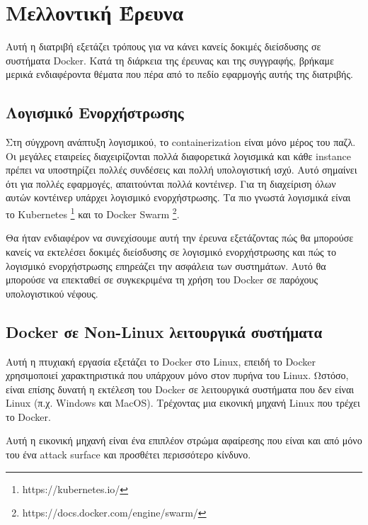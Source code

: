 \chapter{Μελλοντική Έρευνα}
\label{futureWork}

Αυτή η διατριβή εξετάζει τρόπους για να κάνει κανείς δοκιμές διείσδυσης σε
συστήματα \textlatin{Docker}. Κατά τη διάρκεια της έρευνας και της συγγραφής,
βρήκαμε μερικά ενδιαφέροντα θέματα που πέρα από το πεδίο εφαρμογής αυτής της
διατριβής.

\section{Λογισμικό Ενορχήστρωσης}

Στη σύγχρονη ανάπτυξη λογισμικού, το \textlatin{containerization} είναι μόνο
μέρος του παζλ. Οι μεγάλες εταιρείες διαχειρίζονται πολλά διαφορετικά λογισμικά
και κάθε \textlatin{instance} πρέπει να υποστηρίζει πολλές συνδέσεις και πολλή
υπολογιστική ισχύ. Αυτό σημαίνει ότι για πολλές εφαρμογές, απαιτούνται πολλά
κοντέινερ. Για τη διαχείριση όλων αυτών κοντέινερ υπάρχει λογισμικό
ενορχήστρωσης. Τα πιο γνωστά λογισμικά είναι το Kubernetes 
\footnote{\textlatin{https://kubernetes.io/}} και το Docker
Swarm \footnote{\textlatin{https://docs.docker.com/engine/swarm/}}.

Θα ήταν ενδιαφέρον να συνεχίσουμε αυτή την έρευνα εξετάζοντας πώς
θα μπορούσε κανείς να εκτελέσει δοκιμές διείσδυσης σε λογισμικό ενορχήστρωσης
και πώς το λογισμικό ενορχήστρωσης επηρεάζει την ασφάλεια των συστημάτων. Αυτό
θα μπορούσε να επεκταθεί σε συγκεκριμένα τη χρήση του \textlatin{Docker} σε
παρόχους υπολογιστικού νέφους.

\section{\textlatin{Docker} σε \textlatin{Non-Linux} λειτουργικά συστήματα}

Αυτή η πτυχιακή εργασία εξετάζει το \textlatin{Docker} στο \textlatin{Linux},
επειδή το \textlatin{Docker} χρησιμοποιεί χαρακτηριστικά που υπάρχουν μόνο στον
πυρήνα του \textlatin{Linux}. Ωστόσο, είναι επίσης δυνατή η εκτέλεση του
\textlatin{Docker} σε λειτουργικά συστήματα που δεν είναι \textlatin{Linux}
(π.χ. \textlatin{Windows} και \textlatin{MacOS}). Τρέχοντας μια εικονική μηχανή
\textlatin{Linux} που τρέχει το \textlatin{Docker}.

Αυτή η εικονική μηχανή είναι ένα επιπλέον στρώμα αφαίρεσης που είναι και από
μόνο του ένα \textlatin{attack surface} και προσθέτει περισσότερο κίνδυνο.

